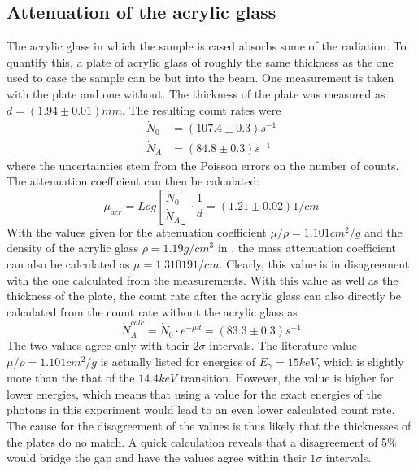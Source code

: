 \subsection{Attenuation of the acrylic glass}
The acrylic glass in which the sample is cased absorbs some of the radiation. To quantify this, a plate of acrylic glass of roughly the same thickness as the one used to case the sample can be but into the beam. One measurement is taken with the plate and one without. The thickness of the plate was measured as $d=\unit{(1.94\pm0.01)}{mm}$. The resulting count rates were
\begin{align}
\dot{N}_0&=\unit{(107.4\pm0.3)}{s^{-1}}\\
\dot{N}_A&=\unit{(84.8\pm0.3)}{s^{-1}}
\end{align}
where the uncertainties stem from the Poisson errors on the number of counts. The attenuation coefficient can then be calculated:
\begin{equation}
\mu_{acr}=Log\left[\frac{\dot{N}_0}{\dot{N}_A}\right]\cdot\frac{1}{d}=\unit{(1.21\pm0.02)}{1/cm}
\end{equation}
With the values given for the attenuation coefficient $\mu/\rho=\unit{1.101}{cm^2/g}$ and the density of the acrylic glass $\rho=\unit{1.19}{g/cm^3}$ in \cite{anleitung}, the mass attenuation coefficient can also be calculated as $\mu=\unit{1.31019}{1/cm}$. Clearly, this value is in disagreement with the one calculated from the measurements. With this value as well as the thickness of the plate, the count rate after the acrylic glass can also directly be calculated from the count rate without the acrylic glass as
\begin{equation}
\dot{N}_A^{calc}=\dot{N}_0\cdot e^{-\mu d}=\unit{(83.3\pm0.3)}{s^{-1}}
\end{equation}
The two values agree only with their $2\sigma$ intervals. The literature value $\mu/\rho=\unit{1.101}{cm^2/g}$ is actually listed for energies of $E_\gamma=\unit{15}{keV}$, which is slightly more than the that of the $\unit{14.4}{keV}$ transition. However, the value is higher for lower energies, which means that using a value for the exact energies of the photons in this experiment would lead to an even lower calculated count rate. The cause for the disagreement of the values is thus likely that the thicknesses of the plates do no match. A quick calculation reveals that a disagreement of 5\% would bridge the gap and have the values agree within their $1\sigma$ intervals.